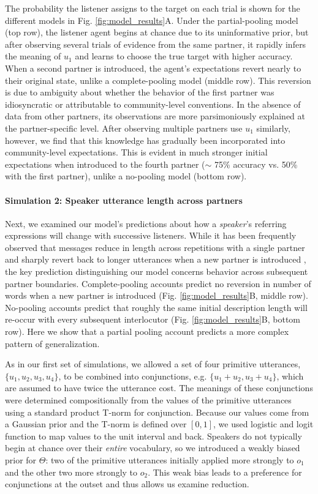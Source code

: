 The probability the listener assigns to the target on each trial is shown for the different models in Fig. \ref{fig:model_results}A.
Under the partial-pooling model (top row), the listener agent begins at chance due to its uninformative prior, but after observing several trials of evidence from the same partner, it rapidly infers the meaning of $u_1$ and learns to choose the true target with higher accuracy.
When a second partner is introduced, the agent's expectations revert nearly to their original state, unlike a complete-pooling model (middle row).
This reversion is due to ambiguity about whether the behavior of the first partner was idiosyncratic or attributable to community-level conventions.
In the absence of data from other partners, its observations are more parsimoniously explained at the partner-specific level.
After observing multiple partners use $u_1$ similarly, however, we find that this knowledge has gradually been incorporated into community-level expectations. 
This is evident in much stronger initial expectations when introduced to the fourth partner ($\sim$ 75\% accuracy vs. 50\% with the first partner), unlike a no-pooling model (bottom row).

\paragraph{Simulation 2: Speaker utterance length across partners}

Next, we examined our model's predictions about how a \emph{speaker}'s referring expressions will change with successive listeners.
While it has been frequently observed that messages reduce in length across repetitions with a single partner \cite{krauss_changes_1964} and sharply revert back to longer utterances when a new partner is introduced \cite{wilkes-gibbs_coordinating_1992}, the key prediction distinguishing our model concerns behavior across subsequent partner boundaries.
Complete-pooling accounts predict no reversion in number of words when a new partner is introduced  (Fig. \ref{fig:model_results}B, middle row).
No-pooling accounts predict that roughly the same initial description length will re-occur with every subsequent interlocutor  (Fig. \ref{fig:model_results}B, bottom row). 
Here we show that a partial pooling account predicts a more complex pattern of generalization.

As in our first set of simulations, we allowed a set of four primitive utterances, $\{u_1, u_2, u_3, u_4\}$, to be combined into conjunctions, e.g. $\{u_1+u_2, u_3+u_4\}$, which are assumed to have twice the utterance cost.
The meanings of these conjunctions were determined compositionally from the values of the primitive utterances using a standard product T-norm for conjunction. 
Because our values come from a Gaussian prior and the T-norm is defined over $[0,1]$, we used logistic and logit function to map values to the unit interval and back.
Speakers do not typically begin at chance over their \emph{entire} vocabulary, so we introduced a weakly biased prior for $\Theta$: two of the primitive utterances initially applied more strongly to $o_1$ and the other two more strongly to $o_2$.
This weak bias leads to a preference for conjunctions at the outset and thus allows us examine reduction.

